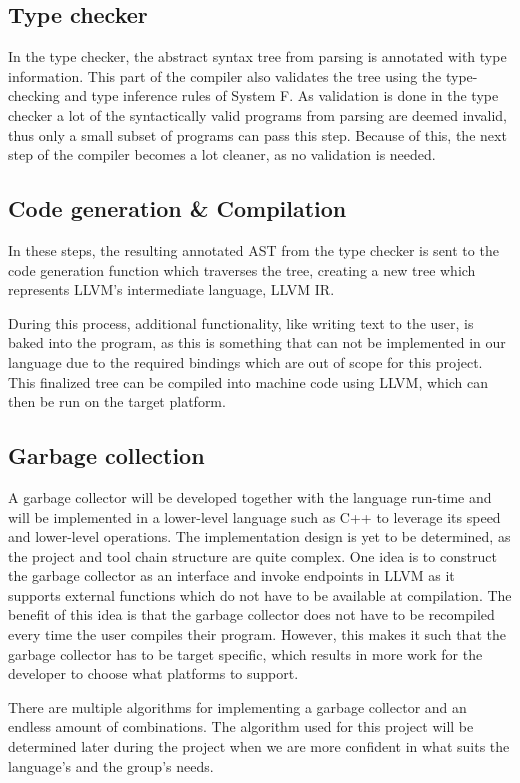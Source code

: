 \documentclass[12pt,a4paper]{article}
\begin{document}
\subsection{Type checker}
In the type checker, the abstract syntax tree from parsing is annotated with type information. This part of
the compiler also validates the tree using the type-checking and type inference rules of System F. As
validation is done in the type checker a lot of the syntactically valid programs from parsing are deemed invalid,
thus only a small subset of programs can pass this step. Because of this, the next step of the compiler
becomes a lot cleaner, as no validation is needed.

\subsection{Code generation \& Compilation}
In these steps, the resulting annotated AST from the type checker is sent to 
the code generation function which traverses the tree, creating a new tree
which represents LLVM's intermediate language, LLVM IR.

During this process, additional functionality, like writing text to the user, is baked into 
the program, as this is something that can not be implemented in our language due to the 
required bindings which are out of scope for this project.
This finalized tree can be compiled into machine code using LLVM, which can then be run on
the target platform.

\subsection{Garbage collection}
A garbage collector will be developed together with the language run-time and will be implemented
in a lower-level language such as C++ to leverage its speed and lower-level operations.
The implementation design is yet to be determined, as the project and tool chain structure
are quite complex. One idea is to construct the garbage collector as an interface and invoke
endpoints in LLVM as it supports external functions which do not have to be available
at compilation. The benefit of this idea is that the garbage collector does not have to
be recompiled every time the user compiles their program. However, this makes it such that the garbage collector has to be
target specific, which results in more work for the developer to choose what platforms to support.

There are multiple algorithms for implementing a garbage collector and an
endless amount of combinations. The algorithm used for this project will be determined later
during the project when we are more confident in what suits the language's and the group's needs.
\end{document}
